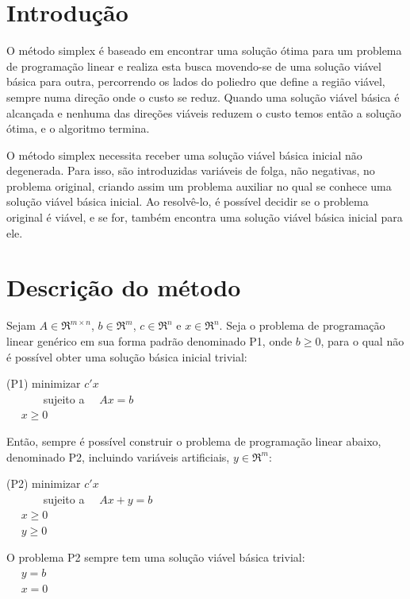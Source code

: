 \documentclass[
	12pt,				%
	openright,			%
	oneside,			%
	a4paper,			%
	english,			%
	french,				%
	spanish,			%
	brazil,				%
	]{abntex2}
\begin{document}
\chapter*[Introdução]{Introdução}

O método simplex é baseado em encontrar uma solução ótima para um problema de programação linear e realiza esta busca movendo-se de uma solução viável básica para outra, percorrendo os lados do poliedro que define a região viável, sempre numa direção onde o custo se reduz. Quando uma solução viável básica é alcançada e nenhuma das direções viáveis reduzem o custo temos então a solução ótima, e o algoritmo termina. 

O método simplex necessita receber uma solução viável básica inicial não degenerada. Para isso, são introduzidas variáveis de folga, não negativas, no problema original, criando assim um problema auxiliar no qual se conhece uma solução viável básica inicial. Ao resolvê-lo, é possível decidir se o problema original é viável, e se for, também encontra uma solução viável básica inicial para ele. 




\chapter{Descrição do método}
Sejam $A \in \Re ^{m \times n}$, $b \in \Re ^m$, $c \in \Re ^n$ e $x \in \Re ^n$.
Seja o problema de programação linear genérico em sua forma padrão denominado P1, onde $b \geq 0$, para o qual não é possível obter uma solução básica inicial trivial:

(P1) 
\indent minimizar $ c'x $\\ 
\indent\indent ~~~~~~ sujeito a~~ $ Ax = b $\\
\indent\indent\indent\indent ~~ $x \geq 0$


Então, sempre é possível construir o problema de programação linear abaixo, denominado P2, incluindo variáveis artificiais, $y \in \Re ^m$: 

(P2)
\indent minimizar $ c'x $\\ 
\indent\indent ~~~~~~ sujeito a~~ $ Ax + y = b $\\
\indent\indent\indent\indent ~~ $x \geq 0$\\
\indent\indent\indent\indent ~~ $y \geq 0$

O problema P2 sempre tem uma solução viável básica trivial:
\\
\indent\indent\indent\indent ~~ $y = b$\\
\indent\indent\indent\indent ~~ $x = 0$
\end{document}
